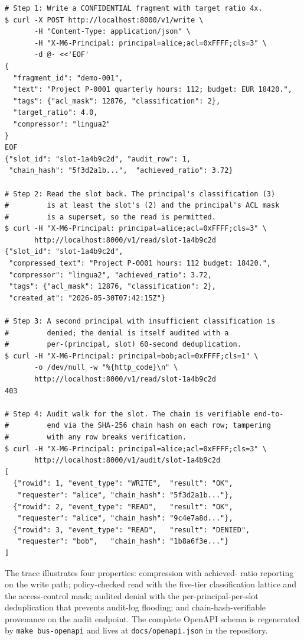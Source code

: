 \begin{verbatim}
# Step 1: Write a CONFIDENTIAL fragment with target ratio 4x.
$ curl -X POST http://localhost:8000/v1/write \
       -H "Content-Type: application/json" \
       -H "X-M6-Principal: principal=alice;acl=0xFFFF;cls=3" \
       -d @- <<'EOF'
{
  "fragment_id": "demo-001",
  "text": "Project P-0001 quarterly hours: 112; budget: EUR 18420.",
  "tags": {"acl_mask": 12876, "classification": 2},
  "target_ratio": 4.0,
  "compressor": "lingua2"
}
EOF
{"slot_id": "slot-1a4b9c2d", "audit_row": 1,
 "chain_hash": "5f3d2a1b...",  "achieved_ratio": 3.72}

# Step 2: Read the slot back. The principal's classification (3)
#         is at least the slot's (2) and the principal's ACL mask
#         is a superset, so the read is permitted.
$ curl -H "X-M6-Principal: principal=alice;acl=0xFFFF;cls=3" \
       http://localhost:8000/v1/read/slot-1a4b9c2d
{"slot_id": "slot-1a4b9c2d",
 "compressed_text": "Project P-0001 hours: 112 budget: 18420.",
 "compressor": "lingua2", "achieved_ratio": 3.72,
 "tags": {"acl_mask": 12876, "classification": 2},
 "created_at": "2026-05-30T07:42:15Z"}

# Step 3: A second principal with insufficient classification is
#         denied; the denial is itself audited with a
#         per-(principal, slot) 60-second deduplication.
$ curl -H "X-M6-Principal: principal=bob;acl=0xFFFF;cls=1" \
       -o /dev/null -w "%{http_code}\n" \
       http://localhost:8000/v1/read/slot-1a4b9c2d
403

# Step 4: Audit walk for the slot. The chain is verifiable end-to-
#         end via the SHA-256 chain hash on each row; tampering
#         with any row breaks verification.
$ curl -H "X-M6-Principal: principal=alice;acl=0xFFFF;cls=3" \
       http://localhost:8000/v1/audit/slot-1a4b9c2d
[
  {"rowid": 1, "event_type": "WRITE",  "result": "OK",
   "requester": "alice", "chain_hash": "5f3d2a1b..."},
  {"rowid": 2, "event_type": "READ",   "result": "OK",
   "requester": "alice", "chain_hash": "9c4e7a8d..."},
  {"rowid": 3, "event_type": "READ",   "result": "DENIED",
   "requester": "bob",   "chain_hash": "1b8a6f3e..."}
]
\end{verbatim}

The trace illustrates four properties: compression with achieved-
ratio reporting on the write path; policy-checked read with the
five-tier classification lattice and the access-control mask;
audited denial with the per-principal-per-slot deduplication that
prevents audit-log flooding; and chain-hash-verifiable provenance
on the audit endpoint. The complete OpenAPI schema is regenerated
by \texttt{make bus-openapi} and lives at \texttt{docs/openapi.json}
in the repository.

